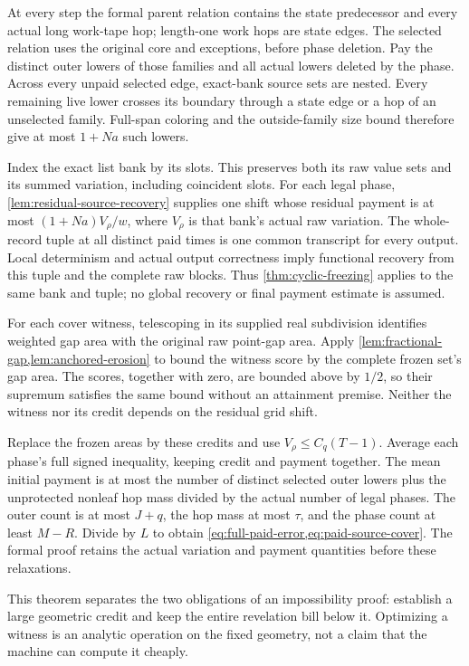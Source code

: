 \begin{outline}
At every step the formal parent relation contains the state predecessor
and every actual long work-tape hop; length-one work hops are state edges.
The selected relation uses the original core and exceptions, before phase
deletion. Pay the distinct outer lowers of those families and all actual
lowers deleted by the phase. Across every unpaid selected edge, exact-bank
source sets are nested. Every remaining live lower crosses its boundary
through a state edge or a hop of an unselected family. Full-span coloring
and the outside-family size bound therefore give at most $1+Na$ such lowers.

Index the exact list bank by its slots. This preserves both its raw value
sets and its summed variation, including coincident slots. For each legal
phase, \cref{lem:residual-source-recovery} supplies one shift whose residual
payment is at most $(1+Na)V_\rho/w$, where $V_\rho$ is that bank's actual
raw variation. The whole-record tuple at all distinct paid times is one
common transcript for every output. Local determinism and actual output
correctness imply functional recovery from this tuple and the complete raw
blocks. Thus \cref{thm:cyclic-freezing} applies to the same bank and tuple;
no global recovery or final payment estimate is assumed.

For each cover witness, telescoping in its supplied real subdivision
identifies weighted gap area with the original raw point-gap area. Apply
\cref{lem:fractional-gap,lem:anchored-erosion} to bound the witness score by
the complete frozen set's gap area. The scores, together with zero, are
bounded above by $1/2$, so their supremum satisfies the same bound without
an attainment premise. Neither the witness nor its credit depends on the
residual grid shift.

Replace the frozen areas by these credits and use
$V_\rho\le C_q(T-1)$. Average each phase's full signed inequality, keeping
credit and payment together. The mean initial payment is at most the
number of distinct selected outer lowers plus the unprotected nonleaf hop
mass divided by the actual number of legal phases. The outer count is at
most $J+q$, the hop mass at most $\tau$, and the phase count at least $M-R$.
Divide by $L$ to obtain
\cref{eq:full-paid-error,eq:paid-source-cover}. The formal proof retains the
actual variation and payment quantities before these relaxations.
\end{outline}

This theorem separates the two obligations of an impossibility proof:
establish a large geometric credit and keep the entire revelation bill
below it. Optimizing a witness is an analytic operation on the fixed
geometry, not a claim that the machine can compute it cheaply.

